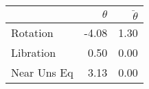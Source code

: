 \begin{tabular}{lrr}
\toprule
{} &  $\theta$ &  $\ddot{\theta}$ \\
\midrule
Rotation    &     -4.08 &             1.30 \\
Libration   &      0.50 &             0.00 \\
Near Uns Eq &      3.13 &             0.00 \\
\bottomrule
\end{tabular}
